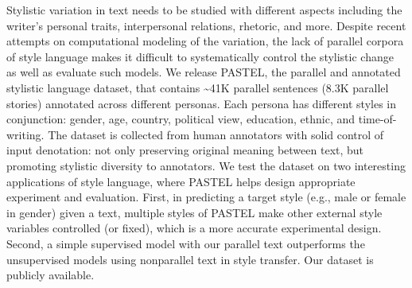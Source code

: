 Stylistic variation in text needs to be studied with different aspects including the writer’s personal traits, interpersonal relations, rhetoric, and more. Despite recent attempts on computational modeling of the variation, the lack of parallel corpora of style language makes it difficult to systematically control the stylistic change as well as evaluate such models. We release PASTEL, the parallel and annotated stylistic language dataset, that contains {\textasciitilde}41K parallel sentences (8.3K parallel stories) annotated across different personas. Each persona has different styles in conjunction: gender, age, country, political view, education, ethnic, and time-of-writing. The dataset is collected from human annotators with solid control of input denotation: not only preserving original meaning between text, but promoting stylistic diversity to annotators. We test the dataset on two interesting applications of style language, where PASTEL helps design appropriate experiment and evaluation. First, in predicting a target style (e.g., male or female in gender) given a text, multiple styles of PASTEL make other external style variables controlled (or fixed), which is a more accurate experimental design. Second, a simple supervised model with our parallel text outperforms the unsupervised models using nonparallel text in style transfer. Our dataset is publicly available.